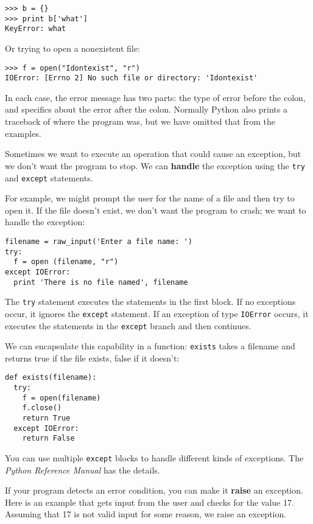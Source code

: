 \beforeverb
\begin{verbatim}
>>> b = {}
>>> print b['what']
KeyError: what
\end{verbatim}
\afterverb
%
Or trying to open a nonexistent file:

\beforeverb
\begin{verbatim}
>>> f = open("Idontexist", "r")
IOError: [Errno 2] No such file or directory: 'Idontexist'
\end{verbatim}
\afterverb
%
In each case, the error
message has two parts: the type of error before
the colon, and specifics about the error after the colon.
Normally Python also prints a traceback of where the program
was, but we have omitted that from the examples.


Sometimes we want to execute an operation that could cause
an exception, but we don't want the program to stop.  We can
{\bf handle} the exception using the {\tt try} and
{\tt except} statements.

For example, we might prompt the user for the name of a file
and then try to open it.  If the file doesn't exist, we don't
want the program to crash; we want to handle the exception:

\beforeverb
\begin{verbatim}
filename = raw_input('Enter a file name: ')
try:
  f = open (filename, "r")
except IOError:
  print 'There is no file named', filename
\end{verbatim}
\afterverb
%
The {\tt try} statement executes the statements in the first block.
If no exceptions occur, it ignores the {\tt except} statement.  If an
exception of type {\tt IOError} occurs, it executes the statements in
the {\tt except} branch and then continues.

We can encapsulate this capability in a function: {\tt exists} takes a
filename and returns true if the file exists, false if it doesn't:

\beforeverb
\begin{verbatim}
def exists(filename):
  try:
    f = open(filename)
    f.close()
    return True
  except IOError:
    return False
\end{verbatim}
\afterverb
%
You can use multiple {\tt except} blocks to handle different kinds of
exceptions.  The {\em Python Reference Manual} has the details.

If your program detects an error condition, you can make it
{\bf raise} an exception.  Here is an example that gets input
from the user and checks for the value 17.  
Assuming that 17 is not valid input for some reason, we raise an
exception.

